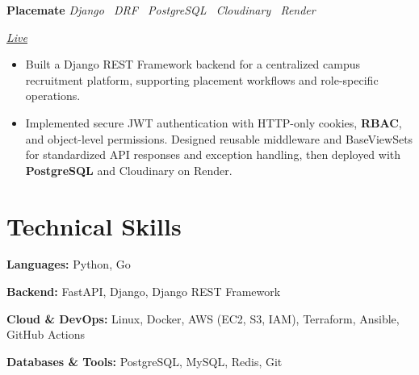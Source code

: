 \documentclass[10pt,a4paper]{article}
\newcommand{\projectentry}[3]{%
    \noindent
    \begin{minipage}[t]{0.62\linewidth}
        \raggedright
        \textbf{#1}
        \hspace{0.7em}
        \textit{\color{textgray}#2}
    \end{minipage}%
    \hfill
    \begin{minipage}[t]{0.34\linewidth}
        \raggedleft
        \itshape\color{textgray}#3
    \end{minipage}%
    \par
}
\begin{document}
\vspace{3pt}

\projectentry
    {Placemate}
    {Django \textperiodcentered\ DRF \textperiodcentered\ PostgreSQL \textperiodcentered\ Cloudinary \textperiodcentered\ Render}
    {\href{https://placemate-coral.vercel.app/}{Live}}
\vspace{2pt}
\begin{itemize}
    \item Built a Django REST Framework backend for a centralized campus recruitment platform, supporting placement workflows and role-specific operations.
    \item Implemented secure JWT authentication with HTTP-only cookies, \textbf{RBAC}, and object-level permissions. Designed reusable middleware and BaseViewSets for standardized API responses and exception handling, then deployed with \textbf{PostgreSQL} and Cloudinary on Render.
\end{itemize}

\section*{Technical Skills}
{\fontsize{10}{12}\selectfont
\textbf{Languages:} Python, Go
\par\vspace{2pt}
\textbf{Backend:} FastAPI, Django, Django REST Framework
\par\vspace{2pt}
\textbf{Cloud \& DevOps:} Linux, Docker, AWS (EC2, S3, IAM), Terraform, Ansible, GitHub Actions
\par\vspace{2pt}
\textbf{Databases \& Tools:} PostgreSQL, MySQL, Redis, Git
}
\end{document}
